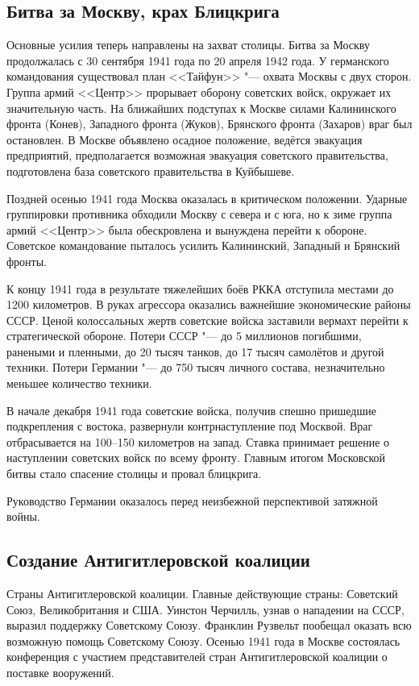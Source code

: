 \subsection{Битва за Москву, крах Блицкрига}

Основные усилия теперь направлены на захват столицы. Битва за Москву продолжалась с 30 сентября 1941 года по 20 апреля 1942 года. У германского командования существовал план <<Тайфун>> "--- охвата Москвы с двух сторон. Группа армий <<Центр>> прорывает оборону советских войск, окружает их значительную часть. На ближайших подступах к Москве силами Калининского фронта (Конев), Западного фронта (Жуков), Брянского фронта (Захаров) враг был остановлен. В Москве объявлено осадное положение, ведётся эвакуация предприятий, предполагается возможная эвакуация советского правительства, подготовлена база советского правительства в Куйбышеве.

Поздней осенью 1941 года Москва оказалась в критическом положении. Ударные группировки противника обходили Москву с севера и с юга, но к зиме группа армий <<Центр>> была обескровлена и вынуждена перейти к обороне. Советское командование пыталось усилить Калининский, Западный и Брянский фронты.

К концу 1941 года в результате тяжелейших боёв РККА отступила местами до 1200 километров. В руках агрессора оказались важнейшие экономические районы СССР. Ценой колоссальных жертв советские войска заставили вермахт перейти к стратегической обороне. Потери СССР "--- до 5 миллионов погибшими, ранеными и пленными, до 20 тысяч танков, до 17 тысяч самолётов и другой техники. Потери Германии "--- до 750 тысяч личного состава, незначительно меньшее количество техники.

В начале декабря 1941 года советские войска, получив спешно пришедшие подкрепления с востока, развернули контрнаступление под Москвой. Враг отбрасывается на 100--150 километров на запад. Ставка принимает решение о наступлении советских войск по всему фронту. Главным итогом Московской битвы стало спасение столицы и провал блицкрига.

Руководство Германии оказалось перед неизбежной перспективой затяжной войны.

\subsection{Создание Антигитлеровской коалиции}
Страны Антигитлеровской коалиции. Главные действующие страны: Советский Союз, Великобритания и США. Уинстон Черчилль, узнав о нападении на СССР, выразил поддержку Советскому Союзу. Франклин Рузвельт пообещал оказать всю возможную помощь Советскому Союзу. Осенью 1941 года в Москве состоялась конференция с участием представителей стран Антигитлеровской коалиции о поставке вооружений.

